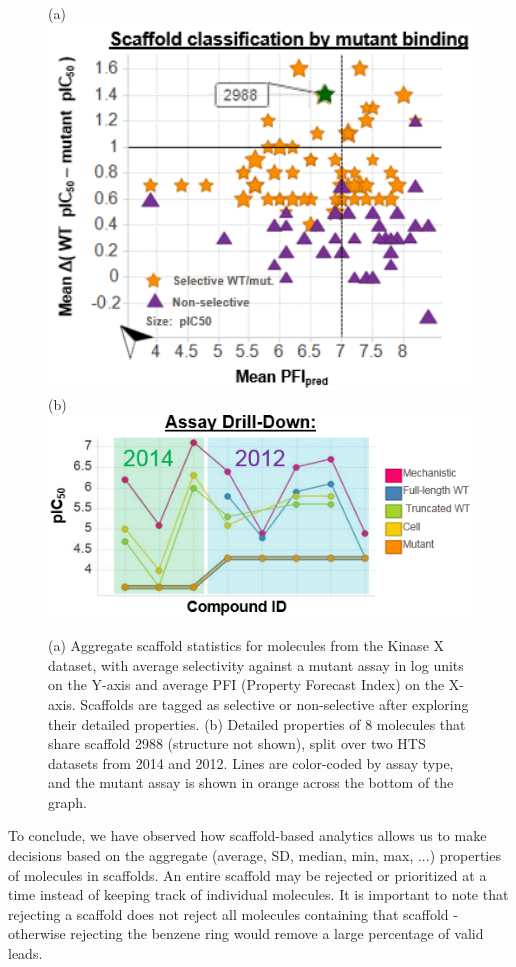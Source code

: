 \documentclass[journal=jacsat,manuscript=article]{achemso}
\begin{document}
\begin{figure}
  (a)\includegraphics[width=5in]{fig/KinaseX_RG_aggr.png}\\
  (b)\includegraphics[width=5in]{fig/KinaseX_RG_drill.png}
  \caption{(a) Aggregate scaffold statistics for molecules from the Kinase X dataset, with average selectivity against a mutant assay in log units on the Y-axis and average PFI (Property Forecast Index) on the X-axis.  Scaffolds are tagged as selective or non-selective after exploring their detailed properties. (b) Detailed properties of 8 molecules that share scaffold 2988 (structure not shown), split over two HTS datasets from 2014 and 2012. Lines are color-coded by assay type, and the mutant assay is shown in orange across the bottom of the graph.   
  }
\label{fig:KinaseX}   
\end{figure}


To conclude, we have observed how scaffold-based analytics allows us to make decisions based on the aggregate (average, SD, median, min, max, ...) properties of molecules in scaffolds. An entire scaffold may be rejected or prioritized at a time instead of keeping track of individual molecules. It is important to note that rejecting a scaffold does not reject all molecules containing that scaffold - otherwise rejecting the benzene ring would remove a large percentage of valid leads.
\end{document}

